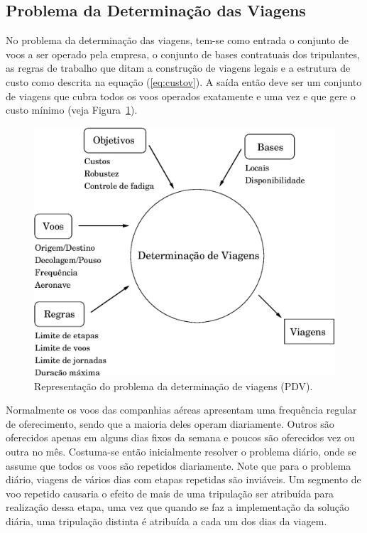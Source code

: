 \documentclass[12pt,a4paper]{article}
\begin{document}

\subsection{Problema da Determinação das Viagens}
\label{sec:viagens}

No problema da determinação das viagens, tem-se como entrada o conjunto de voos a ser operado pela
empresa, o conjunto de bases contratuais dos tripulantes, as regras de trabalho que ditam a
construção de viagens legais e a estrutura de custo como descrita na equação (\ref{eq:custov}). A
saída então deve ser um conjunto de viagens que cubra todos os voos operados exatamente e uma vez e
que gere o custo mínimo (veja Figura~\ref{fig:pdv}).

\begin{figure}[htbp]
	\begin{center}
		\includegraphics[scale=0.5]{fig/pdv.eps}
		\caption{Representação do problema da determinação de viagens (PDV).}
		\label{fig:pdv}
	\end{center}
\end{figure}

Normalmente os voos das companhias aéreas apresentam uma frequência regular de oferecimento, sendo
que a maioria deles operam diariamente. Outros são oferecidos apenas em alguns dias fixos da semana
e poucos são oferecidos vez ou outra no mês. Costuma-se então inicialmente resolver o problema
diário, onde se assume que todos os voos são repetidos diariamente. Note que para o problema diário,
viagens de vários dias com etapas repetidas são inviáveis. Um segmento de voo repetido causaria o
efeito de mais de uma tripulação ser atribuída para realização dessa etapa, uma vez que quando se
faz a implementação da solução diária, uma tripulação distinta é atribuída a cada um dos dias da
viagem.
\end{document}
